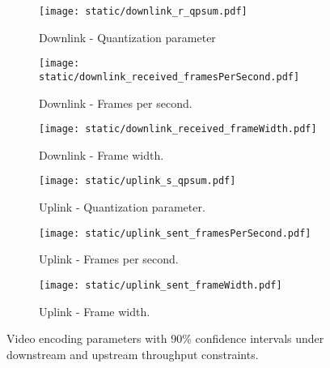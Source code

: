 \begin{figure*}[t]
    \begin{subfigure}[t]{0.33\textwidth}
    		\centering
        \texttt{[image: static/downlink\_r\_qpsum.pdf]}
        \caption{Downlink - Quantization parameter}
 		\label{subfig:downlink_video_qp}
    \end{subfigure}%
    \hfill
	\begin{subfigure}[t]{0.33\textwidth}
        \centering
        \texttt{[image: static/downlink\_received\_framesPerSecond.pdf]}
    \caption{Downlink - Frames per second.}
    \label{subfig:downlink_frames_per_second}
    \end{subfigure}%
    \hfill
	\begin{subfigure}[t]{0.33\textwidth}
        \centering
        \texttt{[image: static/downlink\_received\_frameWidth.pdf]}
    \caption{Downlink - Frame width.}
    \label{subfig:downlink_frame_width}
    \end{subfigure}
    \newline
        \begin{subfigure}[t]{0.33\textwidth}
    		\centering
        \texttt{[image: static/uplink\_s\_qpsum.pdf]}
        \caption{Uplink - Quantization parameter.}
 		\label{subfig:uplink_video_qp}
    \end{subfigure}%
    \hfill
	\begin{subfigure}[t]{0.33\textwidth}
        \centering
        \texttt{[image: static/uplink\_sent\_framesPerSecond.pdf]}
    \caption{Uplink - Frames per second.}
    \label{subfig:uplink_frames_per_second}
    \end{subfigure}%
    \hfill
	\begin{subfigure}[t]{0.33\textwidth}   
        \centering
        \texttt{[image: static/uplink\_sent\_frameWidth.pdf]}
    \caption{Uplink - Frame width.}
    \label{subfig:uplink_frame_width}
    \end{subfigure}
	\caption{Video encoding parameters with 90\% confidence intervals under
    downstream and upstream throughput constraints.}
    \vspace{-1em}
	\label{fig:video_qual}
\end{figure*}

